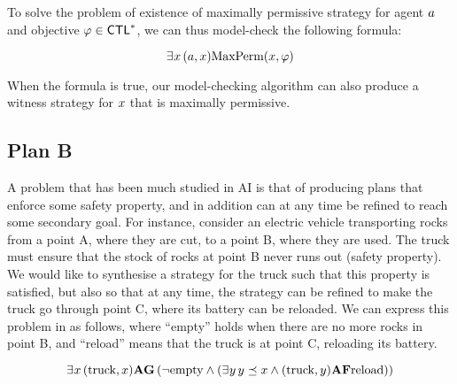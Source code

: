 To solve the problem of existence of maximally permissive strategy for
agent $\ag$ and objective $\phi\in\CTLs$,  we can thus model-check the
following \SLref formula:

\[\Estratnd (\ag,\var) \maxperm(\var,\phi)\]

When the formula is true, our model-checking algorithm can also
produce a witness strategy for $\var$ that is maximally permissive.


\subsection{Plan B}
\label{sec-plan-B}

A problem that has been much studied in AI  is
that of producing plans that enforce some safety property, and in addition
can at any time be refined to reach some secondary goal. For instance,
consider an electric vehicle transporting rocks from a point A, where
they are cut, to a point B, where they are used. The truck must ensure
that the stock of rocks at point B never runs out (safety property). We would like to synthesise a
strategy for the truck such that  this property is satisfied, but also
so that at any time, the strategy can be refined to make the truck go
through point C, where its battery can be reloaded.
We can express  this problem in \SLref as follows, where ``empty''
holds when there are no more rocks in point B, and ``reload'' means
that the truck is at point C, reloading its battery.

\[\Estratnd (\text{truck},\var) \A \always \left ( \neg \text{empty} \wedge
  (\Estratnd[\varb] \varb\refines\var \wedge (\text{truck},\varb)\A\F \text{reload}) \right )\]

